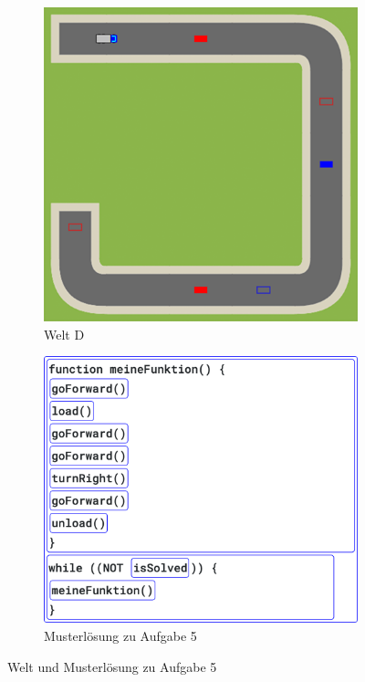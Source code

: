 \begin{figure}[H]
  \begin{subfigure}[b]{0.40\textwidth}
    \includegraphics[width=\textwidth]{gfx/exercises-world-d.png}
    \caption{Welt D}
  \end{subfigure}\hfill
  \begin{subfigure}[b]{0.40\textwidth}
    \includegraphics[width=\textwidth]{gfx/exercises-program-5.png}
    \caption{Musterlösung zu Aufgabe 5}
  \end{subfigure}\hfill
  \caption{Welt und Musterlösung zu Aufgabe 5}
\end{figure}

